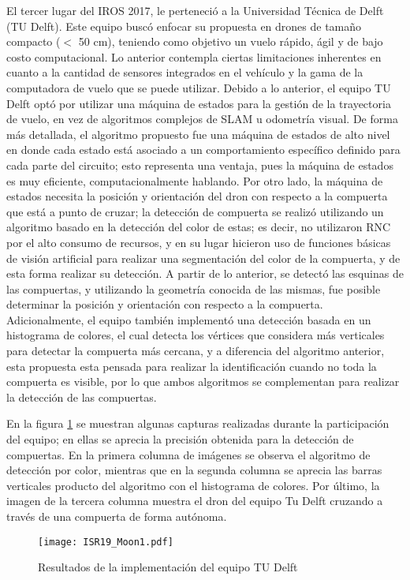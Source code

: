 El tercer lugar del IROS 2017, le perteneció a la Universidad Técnica de Delft (TU Delft). Este equipo buscó enfocar su propuesta en drones de tamaño compacto ($<$ 50 cm), teniendo como objetivo un vuelo rápido, ágil y de bajo costo computacional. Lo anterior contempla ciertas limitaciones inherentes en cuanto a la cantidad de sensores integrados en el vehículo y la gama de la computadora de vuelo que se puede utilizar.
Debido a lo anterior, el equipo TU Delft optó por utilizar una máquina de estados para la gestión de la trayectoria de vuelo, en vez de algoritmos complejos de SLAM u odometría visual. De forma más detallada, el algoritmo propuesto fue una máquina de estados de alto nivel en donde cada estado está asociado a un comportamiento específico definido para cada parte del circuito; esto representa una ventaja, pues la máquina de estados es muy eficiente, computacionalmente hablando. 
Por otro lado, la máquina de estados necesita la posición y orientación del dron con respecto a la compuerta que está a punto de cruzar; la detección de compuerta se realizó utilizando un algoritmo basado en la detección del color de estas; es decir, no utilizaron RNC por el alto consumo de recursos, y en su lugar hicieron uso de funciones básicas de visión artificial para realizar una segmentación del color de la compuerta, y de esta forma realizar su detección. A partir de lo anterior, se detectó las esquinas de las compuertas, y utilizando la geometría conocida de las mismas, fue posible determinar la posición y orientación con respecto a la compuerta. Adicionalmente, el equipo también implementó una detección basada en un histograma de colores, el cual detecta los vértices que considera más verticales para detectar la compuerta más cercana, y a diferencia del algoritmo anterior, esta propuesta esta pensada para realizar la identificación cuando no toda la compuerta es visible, por lo que ambos algoritmos se complementan para realizar la detección de las compuertas. 

En la figura \ref{fig:ISR19_Moon1} se muestran algunas capturas realizadas durante la participación del equipo; en ellas se aprecia la precisión obtenida para la detección de compuertas. En la primera columna de imágenes se observa el algoritmo de detección por color, mientras que en la segunda columna se aprecia las barras verticales producto del algoritmo con el histograma de colores. Por último, la imagen de la tercera columna muestra el dron del equipo Tu Delft cruzando a través de una compuerta de forma autónoma.

\begin{figure}[ht]
    \centering
    \texttt{[image: ISR19\_Moon1.pdf]}
    \caption{Resultados de la implementación del equipo TU Delft \citet{moon2019challenges}}
    \label{fig:ISR19_Moon1}
\end{figure}

